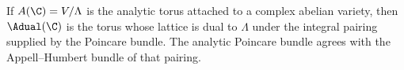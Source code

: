 \begin{theorem}
\label{mumford-thm-analytic-dual-comparison}
If $A(\C)=V/\Lambda$ is the analytic torus attached to a complex abelian
variety, then $\Adual(\C)$ is the torus whose lattice is dual to $\Lambda$ under
the integral pairing supplied by the Poincare bundle.  The analytic Poincare
bundle agrees with the Appell--Humbert bundle of that pairing.
\notready
\end{theorem}
